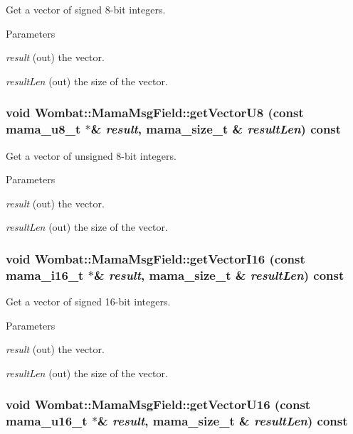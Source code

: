 Get a vector of signed 8-\/bit integers. 
\begin{DoxyParams}{Parameters}
\item[{\em result}](out) the vector. \item[{\em resultLen}](out) the size of the vector. \end{DoxyParams}
\hypertarget{classWombat_1_1MamaMsgField_afff950a7a5a182c91ac63e7f83d90431}{
\subsubsection[{getVectorU8}]{\setlength{\rightskip}{0pt plus 5cm}void Wombat::MamaMsgField::getVectorU8 (const mama\_\-u8\_\-t $\ast$\& {\em result}, \/  {\bf mama\_\-size\_\-t} \& {\em resultLen}) const}}
\label{classWombat_1_1MamaMsgField_afff950a7a5a182c91ac63e7f83d90431}


Get a vector of unsigned 8-\/bit integers. 
\begin{DoxyParams}{Parameters}
\item[{\em result}](out) the vector. \item[{\em resultLen}](out) the size of the vector. \end{DoxyParams}
\hypertarget{classWombat_1_1MamaMsgField_ae79a9f90b23fb085ae8c29f49439e825}{
\subsubsection[{getVectorI16}]{\setlength{\rightskip}{0pt plus 5cm}void Wombat::MamaMsgField::getVectorI16 (const mama\_\-i16\_\-t $\ast$\& {\em result}, \/  {\bf mama\_\-size\_\-t} \& {\em resultLen}) const}}
\label{classWombat_1_1MamaMsgField_ae79a9f90b23fb085ae8c29f49439e825}


Get a vector of signed 16-\/bit integers. 
\begin{DoxyParams}{Parameters}
\item[{\em result}](out) the vector. \item[{\em resultLen}](out) the size of the vector. \end{DoxyParams}
\hypertarget{classWombat_1_1MamaMsgField_aafd3bf156070debc9236ad53501a1426}{
\subsubsection[{getVectorU16}]{\setlength{\rightskip}{0pt plus 5cm}void Wombat::MamaMsgField::getVectorU16 (const mama\_\-u16\_\-t $\ast$\& {\em result}, \/  {\bf mama\_\-size\_\-t} \& {\em resultLen}) const}}
\label{classWombat_1_1MamaMsgField_aafd3bf156070debc9236ad53501a1426}


